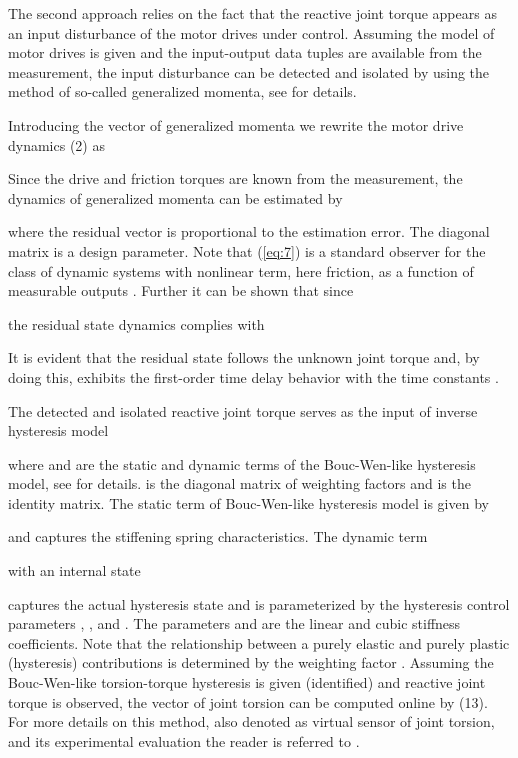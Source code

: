 \documentclass[a4paper, 10pt, conference]{ieeeconf}
\begin{document}
The second approach relies on the fact that the reactive joint
torque appears as an input disturbance of the motor drives under
control. Assuming the model of motor drives is given and the
input-output data tuples  are available from
the measurement, the input disturbance  can be detected and
isolated by using the method of so-called generalized momenta, see
\cite{DePersis01,DeLuca03} for details.

Introducing the vector of generalized momenta 
we rewrite the motor drive dynamics (2) as

Since the drive and friction torques are known from the
measurement, the dynamics of generalized momenta can be estimated
by

where the residual vector  is proportional
to the estimation error. The diagonal matrix  is a design
parameter. Note that (\ref{eq:7}) is a standard observer for the
class of dynamic systems with nonlinear term, here friction, as a
function of measurable outputs \cite{DeLuca03}. Further it can be
shown that since

the residual state dynamics complies with

It is evident that the residual state  follows the unknown
joint torque and, by doing this, exhibits the first-order time
delay behavior with the time constants .

The detected and isolated reactive joint torque 
serves as the input of inverse hysteresis model

where  and  are the static and dynamic terms of the
Bouc-Wen-like hysteresis model, see \cite{Rud12a,Ruderman2014b}
for details. 
is the diagonal matrix of weighting factors  and
 is the identity matrix. The static term of Bouc-Wen-like
hysteresis model is given by

and captures the stiffening spring characteristics. The dynamic
term

with an internal state

captures the actual hysteresis state and is parameterized by the
hysteresis control parameters , , and . The
parameters  and  are the linear and cubic stiffness
coefficients. Note that the relationship between a purely elastic
and purely plastic (hysteresis) contributions is determined by the
weighting factor . Assuming the Bouc-Wen-like torsion-torque
hysteresis is given (identified) and reactive joint torque is
observed, the vector of joint torsion can be computed online by
(13). For more details on this method, also denoted as virtual
sensor of joint torsion, and its experimental evaluation the
reader is referred to \cite{Ruderman2014b,Ruderman2014c}.
\end{document}
